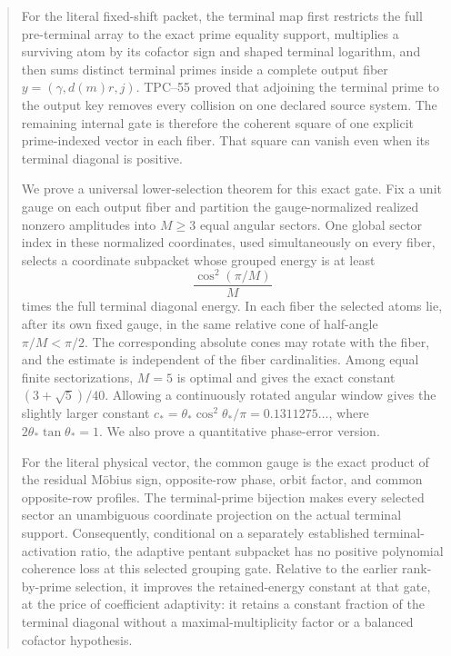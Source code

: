 \begin{abstract}
For the literal fixed-shift packet, the terminal map first restricts the
full pre-terminal array to the exact prime equality support, multiplies a
surviving atom by its cofactor sign and shaped terminal logarithm, and then
sums distinct terminal primes inside a complete output fiber
\(y=(\gamma,d(m)r,j)\).  TPC--55 proved that adjoining the terminal prime
to the output key removes every collision on one declared source system.
The remaining internal gate is therefore the coherent square of one
explicit prime-indexed vector in each fiber.  That square can vanish even
when its terminal diagonal is positive.

We prove a universal lower-selection theorem for this exact gate.  Fix a
unit gauge on each output fiber and partition the gauge-normalized realized
nonzero amplitudes into \(M\ge3\) equal angular sectors.  One global sector
index in these normalized coordinates, used simultaneously on every fiber,
selects a coordinate subpacket
whose grouped energy is at least
\[
 \frac{\cos^2(\pi/M)}{M}
\]
times the full terminal diagonal energy.  In each fiber the selected atoms
lie, after its own fixed gauge, in the same relative cone of half-angle
\(\pi/M<\pi/2\).  The corresponding absolute cones may rotate with the
fiber, and the estimate is independent of the fiber cardinalities.  Among
equal finite sectorizations, \(M=5\) is
optimal and gives the exact constant
\((3+\sqrt5)/40\).  Allowing a continuously rotated angular window gives
the slightly larger constant
\(c_*=\theta_*\cos^2\theta_*/\pi=0.1311275\ldots\), where
\(2\theta_*\tan\theta_*=1\).  We also prove a quantitative phase-error
version.

For the literal physical vector, the common gauge is the exact product of
the residual M\"obius sign, opposite-row phase, orbit factor, and common
opposite-row profiles.  The terminal-prime bijection makes every selected
sector an unambiguous coordinate projection on the actual terminal
support.  Consequently, conditional on a separately established
terminal-activation ratio, the adaptive pentant subpacket has no positive
polynomial coherence loss at this selected grouping gate.  Relative to the
earlier rank-by-prime selection, it improves the retained-energy constant at
that gate, at the price of coefficient adaptivity: it retains a constant
fraction of the terminal diagonal without a maximal-multiplicity factor or
a balanced cofactor hypothesis.


\end{abstract}
